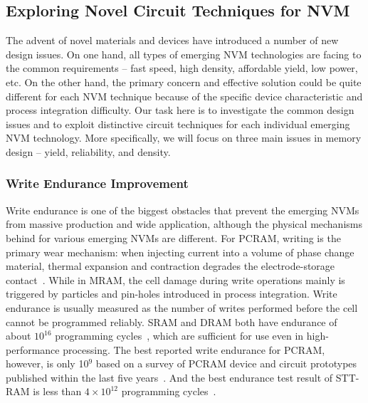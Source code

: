 
\subsection{Exploring Novel Circuit Techniques for NVM}

The advent of novel materials and devices have introduced a number of new design issues. On one hand, all types of emerging NVM technologies are facing to the common requirements -- fast speed, high density, affordable yield, low power, etc. On the other hand, the primary concern and effective solution could be quite different for each NVM technique because of the specific device characteristic and process integration difficulty. Our task here is to investigate the common design issues and to exploit distinctive circuit techniques for each individual emerging NVM technology. More specifically, we will focus on three main issues in memory design -- yield, reliability, and density.

\subsubsection{Write Endurance Improvement}

Write endurance is one of the biggest obstacles that prevent the emerging NVMs from massive production and wide application, although the physical mechanisms behind for various emerging NVMs are different. For PCRAM, writing is the primary wear mechanism: when injecting current into a volume of phase change material, thermal expansion and contraction degrades the electrode-storage contact~\cite{Lee09}. While in MRAM, the cell damage during write operations mainly is triggered by particles and pin-holes introduced in process integration.  Write endurance is usually measured as the number of writes performed before the cell cannot be programmed reliably. SRAM and DRAM both have endurance of about $10^{16}$ programming cycles~\cite{ITRS07}, which are sufficient for use even in high-performance processing. The best reported write endurance for PCRAM, however, is only 10$^9$ based on a survey of PCRAM device and circuit prototypes published within the last five years~\cite{Lee09}. And the best endurance test result of STT-RAM is less than $4\times10^{12}$ programming cycles~\cite{Diao07}.

